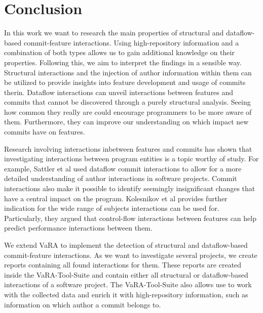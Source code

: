 \section*{Conclusion}\label{ch:conclusion}

In this work we want to research the main properties of structural and dataflow-based commit-feature interactions.
Using high-repository information and a combination of both types allows us to gain additional knowledge on their properties.
Following this, we aim to interpret the findings in a sensible way.
Structural interactions and the injection of author information within them can be utilized to provide insights into feature development and usage of commits therin.
Dataflow interactions can unveil interactions between features and commits that cannot be discovered through a purely structural analysis.
Seeing how common they really are could encourage programmers to be more aware of them.
Furthermore, they can improve our understanding on which impact new commits have on features. 

Research involving interactions inbetween features and commits has shown that investigating interactions between program entities is a topic worthy of study.
For example, Sattler et al used dataflow commit interactions to allow for a more detailed understanding of author interactions in software projects. 
Commit interactions also make it possible to identify seemingly insignificant changes that have a central impact on the program.
Kolesnikov et al provides further indication for the wide range of subjects interactions can be used for.
Particularly, they argued that control-flow interactions between features can help predict performance interactions between them. 

We extend VaRA to implement the detection of structural and dataflow-based commit-feature interactions.
As we want to investigate several projects, we create reports containing all found interactions for them.
These reports are created inside the VaRA-Tool-Suite and contain either all structural or dataflow-based interactions of a software project.
The VaRA-Tool-Suite also allows use to work with the collected data and enrich it with high-repository information, such as information on which author a commit belongs to.

